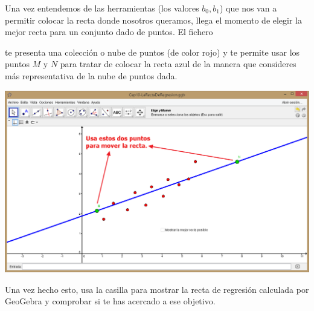 \documentclass[10pt,a4paper]{article}\usepackage[]{graphicx}\usepackage[]{color}
\begin{document}
Una vez entendemos de las herramientas (los valores $b_0, b_1$) que nos van a permitir colocar la recta donde nosotros queramos, llega el momento de elegir la mejor recta para un conjunto dado de puntos. El fichero
\begin{center}
\end{center}
te presenta una colección o nube de puntos (de color rojo) y te permite usar los puntos $M$ y $N$ para tratar de colocar la recta azul de la manera que consideres más representativa de la nube de puntos dada.
\begin{center}
    \includegraphics[width=15.5cm]{../fig/Tut10-21.png}
\end{center}
Una vez hecho esto, usa la casilla para mostrar la recta de regresión calculada por GeoGebra y comprobar si te has acercado a ese objetivo.
\end{document}
